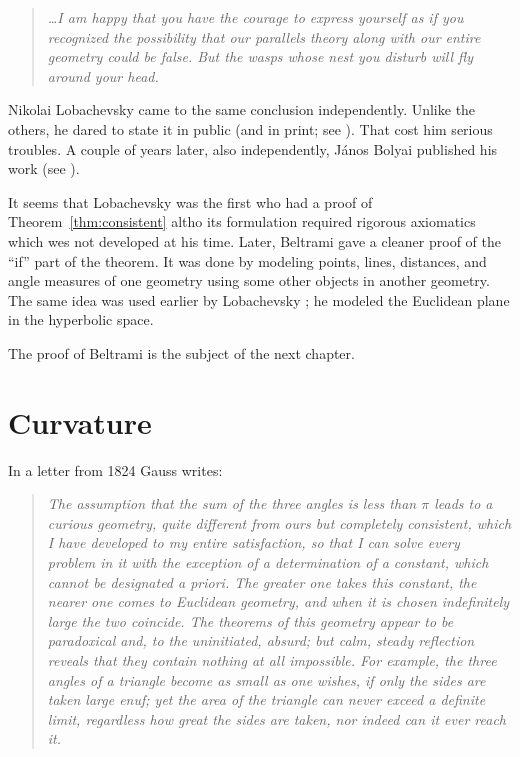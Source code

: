\smallskip

\begin{quotation}{\it
\dots I am happy that you have the courage to express yourself as if you recognized the possibility
that our parallels theory along with our entire geometry could be false. But the wasps whose
nest you disturb will fly around your head.}
\end{quotation}

\smallskip

Nikolai Lobachevsky came to the same conclusion independently.
Unlike the others, he dared to state it in public (and in print; see \cite{lobachevsky}).
That cost him serious troubles.
A couple of years later, also independently, János Bolyai published his work (see \cite{bolyai}).

It seems that Lobachevsky was the first who had a proof of Theorem~\ref{thm:consistent} altho its formulation required rigorous axiomatics which wes not developed at his time.
Later, Beltrami gave a cleaner proof of the ``if'' part of the theorem.
It was done by modeling points, lines, distances, and angle measures of one geometry using some other objects in another geometry.
The same idea was used earlier by Lobachevsky \cite[\S34]{lobachevsky-1840}; 
he modeled the Euclidean plane in the hyperbolic space.

The proof of Beltrami is the subject of the next chapter. 



\section*{Curvature}
In a letter from 1824 Gauss writes: 

\begin{quotation}{\it
The assumption that the sum of the three angles is less than $\pi$ leads to a curious geometry, 
quite different from ours but completely consistent, 
which I have developed to my entire satisfaction, 
so that I can solve every problem in it with the exception of a determination of a constant, which cannot be designated a priori. 
The greater one takes this constant, the nearer one comes to Euclidean geometry, 
and when it is chosen indefinitely large the two coincide.
The theorems of this geometry appear to be paradoxical and, 
to the uninitiated, absurd; but calm, steady reflection reveals that they contain nothing at all impossible. 
For example, the three angles of a triangle become as small as one wishes, if only the sides are taken large enuf; 
yet the area of the triangle can never exceed a definite limit, regardless how great the sides are taken, 
nor indeed can it ever reach it.}
\end{quotation} 

